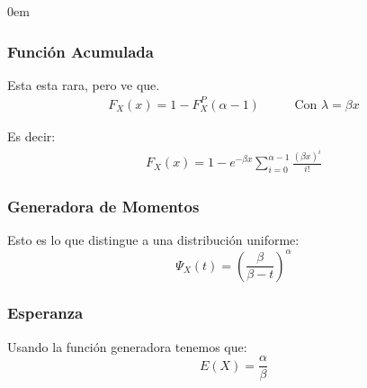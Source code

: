 \documentclass[12pt, fleqn]{report}                             %
\newenvironment{SmallIndentation}[1][0.75em]                    %
        {\begin{adjustwidth}{#1}{}\begin{footnotesize}}             %
        {\end{footnotesize}\end{adjustwidth}}                       %
\DeclareMathOperator \MegaSpace {\quad \quad}                   %
\theoremstyle{break}                                            %
\newcommand{\Wrap}[1]           {\left( #1 \right)}             %
\newcommand{\pfrac}[2]      {\Wrap{\dfrac{#1}{#2}}}             %
\begin{document}
\begin{multicols}{2}
\begin{SmallIndentation}[0em]
                    \subsubsection{Función Acumulada}

                        Esta esta rara, pero ve que.
                        \begin{align*}
                            F_X(x) = 1 - F_X^P (\alpha - 1) \MegaSpace \text{Con $\lambda = \beta x$}
                        \end{align*}

                        Es decir:
                        \begin{align*}
                            F_X(x) = 1 - e^{-\beta x} \sum_{i = 0}^{\alpha - 1} \frac{(\beta x)^i}{i!}
                        \end{align*}


                    \subsubsection{Generadora de Momentos}

                        Esto es lo que distingue a una distribución uniforme:
                        \begin{equation*}
                            \Psi_X(t) = \pfrac{\beta}{\beta - t}^\alpha
                        \end{equation*}

                    \subsubsection{Esperanza}

                        Usando la función generadora tenemos que:
                        \begin{equation*}
                            E(X) = \dfrac{\alpha}{\beta}
                        \end{equation*}



\end{SmallIndentation}
\end{multicols}
\end{document}
